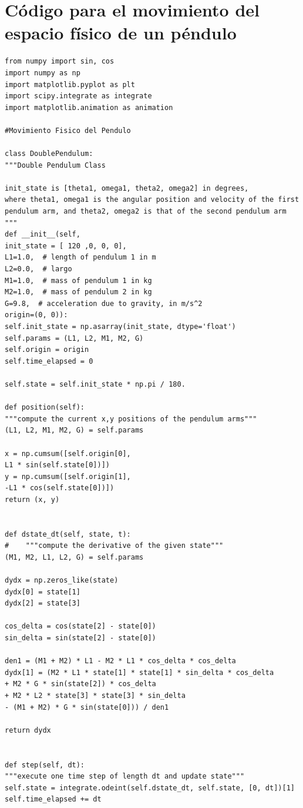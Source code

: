 \documentclass[12pt]{article}
\begin{document}
\section{Código para el movimiento del espacio físico de un péndulo}
\begin{verbatim}
from numpy import sin, cos
import numpy as np
import matplotlib.pyplot as plt
import scipy.integrate as integrate
import matplotlib.animation as animation

#Movimiento Fisico del Pendulo

class DoublePendulum:
"""Double Pendulum Class

init_state is [theta1, omega1, theta2, omega2] in degrees,
where theta1, omega1 is the angular position and velocity of the first
pendulum arm, and theta2, omega2 is that of the second pendulum arm
"""
def __init__(self,
init_state = [ 120 ,0, 0, 0],
L1=1.0,  # length of pendulum 1 in m
L2=0.0,  # largo
M1=1.0,  # mass of pendulum 1 in kg
M2=1.0,  # mass of pendulum 2 in kg
G=9.8,  # acceleration due to gravity, in m/s^2
origin=(0, 0)): 
self.init_state = np.asarray(init_state, dtype='float')
self.params = (L1, L2, M1, M2, G)
self.origin = origin
self.time_elapsed = 0

self.state = self.init_state * np.pi / 180.

def position(self):
"""compute the current x,y positions of the pendulum arms"""
(L1, L2, M1, M2, G) = self.params

x = np.cumsum([self.origin[0],
L1 * sin(self.state[0])])
y = np.cumsum([self.origin[1],
-L1 * cos(self.state[0])])
return (x, y)


def dstate_dt(self, state, t):
#    """compute the derivative of the given state"""
(M1, M2, L1, L2, G) = self.params

dydx = np.zeros_like(state)
dydx[0] = state[1]
dydx[2] = state[3]

cos_delta = cos(state[2] - state[0])
sin_delta = sin(state[2] - state[0])

den1 = (M1 + M2) * L1 - M2 * L1 * cos_delta * cos_delta
dydx[1] = (M2 * L1 * state[1] * state[1] * sin_delta * cos_delta
+ M2 * G * sin(state[2]) * cos_delta
+ M2 * L2 * state[3] * state[3] * sin_delta
- (M1 + M2) * G * sin(state[0])) / den1

return dydx


def step(self, dt):
"""execute one time step of length dt and update state"""
self.state = integrate.odeint(self.dstate_dt, self.state, [0, dt])[1]
self.time_elapsed += dt


\end{verbatim}
\end{document}
